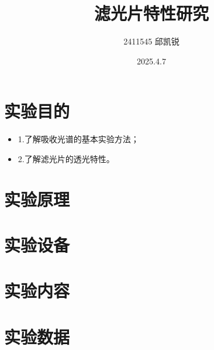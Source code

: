 \documentclass{article}
\title{滤光片特性研究}
\author{2411545 邱凯锐}
\date{2025.4.7}
\begin{document}
\maketitle
\section{实验目的}
\begin{itemize}
    \item 1.了解吸收光谱的基本实验方法；
    \item 2.了解滤光片的透光特性。
\end{itemize}
\section{实验原理}
\section{实验设备}
\section{实验内容}
\section{实验数据}
\end{document}
